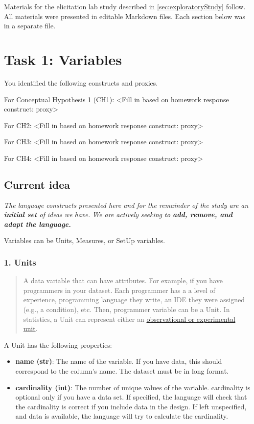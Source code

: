 Materials for the elicitation lab study described in
\autoref{sec:exploratoryStudy} follow. All materials were presented in editable
Markdown files. Each section below was in a separate file.

\section{Task 1: Variables}

You identified the following constructs and proxies.

For Conceptual Hypothesis 1 (CH1): <Fill in based on homework response construct: proxy>

For CH2:  <Fill in based on homework response construct: proxy>

For CH3: <Fill in based on homework response construct: proxy>

For CH4: <Fill in based on homework response construct: proxy>

\subsection*{Current idea}
\emph{The language constructs presented here and for the remainder of
the study are an \textbf{initial set} of ideas we have. We are actively
seeking to \textbf{add, remove, and adapt the language.}}

Variables can be Units, Measures, or SetUp variables.

\subsubsection{1. Units}

\begin{quote}
A data variable that can have attributes. For example, if you have
programmers in your dataset. Each programmer has a a level of
experience, programming language they write, an IDE they were assigned
(e.g., a condition), etc. Then, programmer variable can be a Unit. In
statistics, a Unit can represent either an
\href{https://en.wikipedia.org/wiki/Statistical_unit}{observational or
experimental unit}.
\end{quote}


A Unit has the following properties:
\begin{itemize}
    \item \textbf{name (str)}: The name of the variable. If you have data, this should correspond to the column's name. The dataset must be in long format.
    \item \textbf{cardinality (int)}: The number of unique values of the variable. cardinality is optional only if you have a data set. If specified, the language will check that the cardinality is correct if you include data in the design. If left unspecified, and data is available, the language will try to calculate the cardinality.
\end{itemize}

